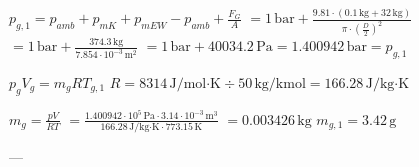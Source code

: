 \( p_{g,1} = p_{amb} + p_{mK} + p_{mEW} - p_{amb} + \frac{F_{G}}{A} \)  
\( = 1 \, \text{bar} + \frac{9.81 \cdot (0.1 \, \text{kg} + 32 \, \text{kg})}{\pi \cdot \left(\frac{D}{2}\right)^2} \)  
\( = 1 \, \text{bar} + \frac{374.3 \, \text{kg}}{7.854 \cdot 10^{-3} \, \text{m}^2} \)  
\( = 1 \, \text{bar} + 40034.2 \, \text{Pa} = 1.400942 \, \text{bar} = p_{g,1} \)  

\( p_{g} V_{g} = m_{g} R T_{g,1} \)  
\( R = 8314 \, \text{J/mol·K} \div 50 \, \text{kg/kmol} = 166.28 \, \text{J/kg·K} \)  

\( m_{g} = \frac{p V}{R T} \)  
\( = \frac{1.400942 \cdot 10^5 \, \text{Pa} \cdot 3.14 \cdot 10^{-3} \, \text{m}^3}{166.28 \, \text{J/kg·K} \cdot 773.15 \, \text{K}} \)  
\( = 0.003426 \, \text{kg} \)  
\( m_{g,1} = 3.42 \, \text{g} \)  

---